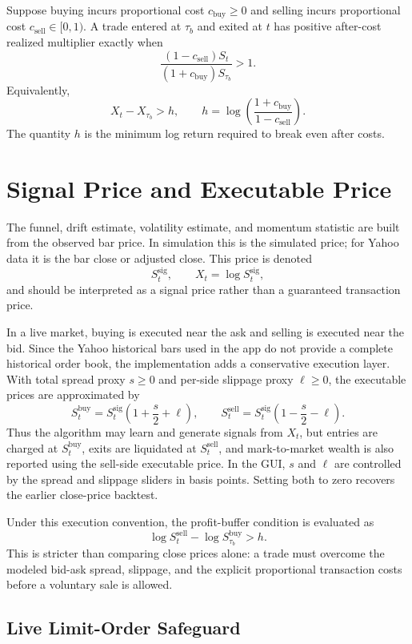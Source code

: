 \documentclass[11pt]{article}
\begin{document}
Suppose buying incurs proportional cost \(c_{\mathrm{buy}}\geq 0\) and selling incurs proportional cost \(c_{\mathrm{sell}}\in[0,1)\). A trade entered at \(\tau_b\) and exited at \(t\) has positive after-cost realized multiplier exactly when
\[
\frac{(1-c_{\mathrm{sell}})S_t}
{(1+c_{\mathrm{buy}})S_{\tau_b}}>1.
\]
Equivalently,
\[
X_t-X_{\tau_b}>h,
\qquad
h=
\log\left(\frac{1+c_{\mathrm{buy}}}{1-c_{\mathrm{sell}}}\right).
\]
The quantity \(h\) is the minimum log return required to break even after costs.

\section{Signal Price and Executable Price}

The funnel, drift estimate, volatility estimate, and momentum statistic are built from the observed bar price. In simulation this is the simulated price; for Yahoo data it is the bar close or adjusted close. This price is denoted
\[
S_t^{\mathrm{sig}},
\qquad
X_t=\log S_t^{\mathrm{sig}},
\]
and should be interpreted as a signal price rather than a guaranteed transaction price.

In a live market, buying is executed near the ask and selling is executed near the bid. Since the Yahoo historical bars used in the app do not provide a complete historical order book, the implementation adds a conservative execution layer. With total spread proxy \(s\geq 0\) and per-side slippage proxy \(\ell\geq 0\), the executable prices are approximated by
\[
S_t^{\mathrm{buy}}
=
S_t^{\mathrm{sig}}\left(1+\frac{s}{2}+\ell\right),
\qquad
S_t^{\mathrm{sell}}
=
S_t^{\mathrm{sig}}\left(1-\frac{s}{2}-\ell\right).
\]
Thus the algorithm may learn and generate signals from \(X_t\), but entries are charged at \(S_t^{\mathrm{buy}}\), exits are liquidated at \(S_t^{\mathrm{sell}}\), and mark-to-market wealth is also reported using the sell-side executable price. In the GUI, \(s\) and \(\ell\) are controlled by the spread and slippage sliders in basis points. Setting both to zero recovers the earlier close-price backtest.

Under this execution convention, the profit-buffer condition is evaluated as
\[
\log S_t^{\mathrm{sell}}
-
\log S_{\tau_b}^{\mathrm{buy}}
>h.
\]
This is stricter than comparing close prices alone: a trade must overcome the modeled bid-ask spread, slippage, and the explicit proportional transaction costs before a voluntary sale is allowed.

\subsection{Live Limit-Order Safeguard}
\end{document}
